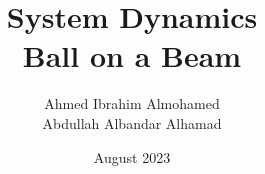 \documentclass{report}
\title{System Dynamics \\ Ball on a Beam}
\author{Ahmed Ibrahim Almohamed \\  Abdullah Albandar Alhamad }
\date{August 2023}
\begin{document}
\tableofcontents
\maketitle



\makenomenclature




\end{document}
